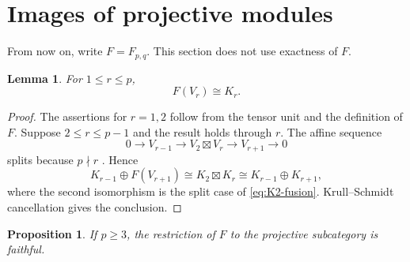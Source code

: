 \documentclass[12pt,leqno]{amsart}
\numberwithin{equation}{section}
\newtheorem{lem}[thm]{Lemma}
\newtheorem{prop}[thm]{Proposition}
\newcommand{\boxt}{\boxtimes}
\begin{document}
\section{Images of projective modules}\label{sec:images}

From now on, write $F=F_{p,q}$.  This section does not use exactness of
$F$.

\begin{lem}\label{lem:F-small-Weyl}
For $1\leq r\leq p$,
\[
 F(V_r)\cong K_r.
\]
\end{lem}

\begin{proof}
The assertions for $r=1,2$ follow from the tensor unit and the definition
of $F$.  Suppose $2\leq r\leq p-1$ and the result holds through $r$.
The affine sequence
\[
 0\longrightarrow V_{r-1}\longrightarrow V_2\boxt V_r
 \longrightarrow V_{r+1}\longrightarrow0
\]
splits because $p\nmid r$ \cite[Theorem~2.23]{McRaeYang}.  Hence
\[
 K_{r-1}\oplus F(V_{r+1})
 \cong K_2\boxt K_r
 \cong K_{r-1}\oplus K_{r+1},
\]
where the second isomorphism is the split case of
\eqref{eq:K2-fusion}.  Krull--Schmidt cancellation gives the conclusion.
\end{proof}

\begin{prop}\label{prop:F-faithful-projectives-large}
If $p\geq3$, the restriction of $F$ to the projective subcategory is
faithful.
\end{prop}
\end{document}
